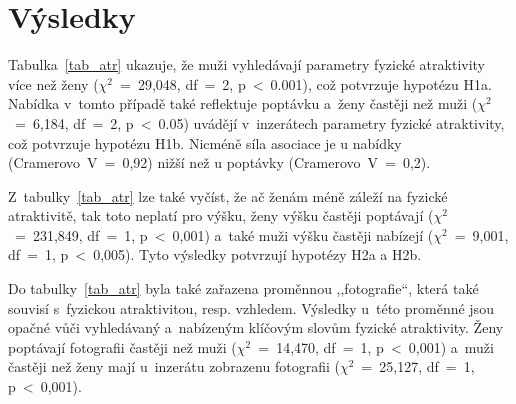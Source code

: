\documentclass[a4paper, 12pt, notitlepage, oneside, numbers=noenddot]{report}
\begin{document}
\section{Výsledky}


Tabulka~\ref{tab_atr} ukazuje, že muži vyhledávají parametry fyzické
atraktivity více než ženy ($\chi^2$~=~29,048, df~=~2,
p~{\textless}~0.001), což potvrzuje hypotézu H1a. Nabídka v~tomto
případě také reflektuje poptávku a~ženy častěji než muži
($\chi^2$~=~6,184, df~=~2, p~{\textless}~0.05) uvádějí v~inzerátech
parametry fyzické atraktivity, což potvrzuje hypotézu H1b. Nicméně
síla asociace je u nabídky (Cramerovo~V~=~0,92) nižší než u poptávky
(Cramerovo~V~=~0,2).

Z~tabulky~\ref{tab_atr} lze také vyčíst, že ač ženám méně záleží na
fyzické atraktivitě, tak toto neplatí pro výšku, ženy výšku častěji
poptávají ($\chi^2$~=~231,849, df~=~1, p~{\textless}~0,001) a~také
muži výšku častěji nabízejí ($\chi^2$~=~9,001, df~=~1,
p~{\textless}~0,005).  Tyto výsledky potvrzují hypotézy H2a a H2b.

Do tabulky~\ref{tab_atr} byla také zařazena proměnnou ,,fotografie``,
která také souvisí s~fy\-zickou atraktivitou, resp. vzhledem. Výsledky
u~této proměnné jsou opačné vůči vy\-hle\-dávaný a~nabízeným klíčovým
slovům fyzické atraktivity.  Ženy poptávají fotografii častěji než
muži ($\chi^2$~=~14,470, df~=~1, p~{\textless}~0,001) a~muži častěji
než ženy mají u~inzerátu zobrazenu fotografii ($\chi^2$~=~25,127,
df~=~1, p~{\textless}~0,001).
\end{document}
